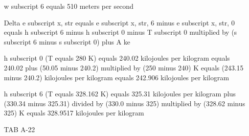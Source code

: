 w subscript 6 equals 510 meters per second  

Delta e subscript x, str equals e subscript x, str, 6 minus e subscript x, str, 0  
equals h subscript 6 minus h subscript 0 minus T subscript 0 multiplied by (s subscript 6 minus s subscript 0) plus A ke  

h subscript 0 (T equals 280 K) equals 240.02 kilojoules per kilogram  
equals 240.02 plus (50.05 minus 240.2) multiplied by (250 minus 240) K  
equals (243.15 minus 240.2) kilojoules per kilogram  
equals 242.906 kilojoules per kilogram  

h subscript 6 (T equals 328.162 K)  
equals 325.31 kilojoules per kilogram  
plus (330.34 minus 325.31) divided by (330.0 minus 325) multiplied by (328.62 minus 325) K  
equals 328.9517 kilojoules per kilogram  

TAB A-22